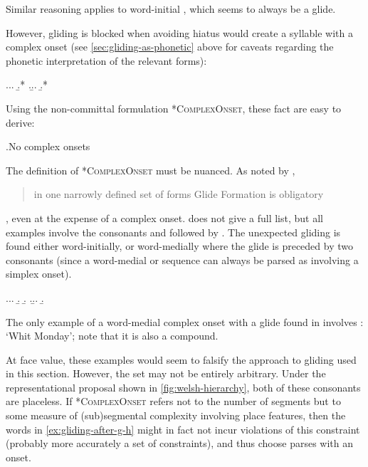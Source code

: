 Similar reasoning applies to word-initial \ipa{[i]}, which seems to always be a glide.

However, gliding is blocked when avoiding hiatus would create a syllable with a complex onset (see \cref{sec:gliding-as-phonetic} above for caveats regarding the phonetic interpretation of the relevant forms):

\ex.\a.\a.
\b.*\mbi{[ˈdjolχ]}
\z.\b.\a.
\b.*\mbi{[ˈdwarnod]}

Using the non-committal formulation *\textsc{ComplexOnset}, these fact are easy to derive:

\ex.\label{ex:no-complex-onsets}No complex onsets\\
\begin{OTtableau}{4}
\end{OTtableau}


The definition of *\textsc{ComplexOnset} must be nuanced. As noted by \citet[p.~140]{awbery86:_pembr_welsh}, \blockquote{in one narrowly defined set of forms Glide Formation is obligatory}, even at the expense of a complex onset. \citet{awbery86:_pembr_welsh} does not give a full list, but all examples involve the consonants \ipa{[ɡ]} and \ipa{[h]} followed by \ipa{[w]}. The unexpected gliding is found either word-initially, or word-medially where the glide is preceded by two consonants (since a word-medial \ipa{[VCw]} or \ipa{[Cj]} sequence can always be parsed as involving a simplex onset).

\ex.\label{ex:gliding-after-g-h}\a.\a.
\b.
\b.
\z.\b.\a.
\b.

The only example of a word-medial complex onset with a glide found in \citet{awbery86:_pembr_welsh} involves \ipa{[ɡ]}: \ipa{[ˈɬiŋɡwin]} `Whit Monday'; note that it is also a compound.

At face value, these examples would seem to falsify the approach to gliding used in this section. However, the set \ipa{[ɡ~h]} may not be entirely arbitrary. Under the representational proposal shown in \cref{fig:welsh-hierarchy}, both of these consonants are placeless. If *\textsc{ComplexOnset} refers not to the number of segments but to some measure of (sub)segmental complexity involving place features, then the words in \cref{ex:gliding-after-g-h} might in fact not incur violations of this constraint (probably more accurately a set of constraints), and thus choose parses with an onset.

